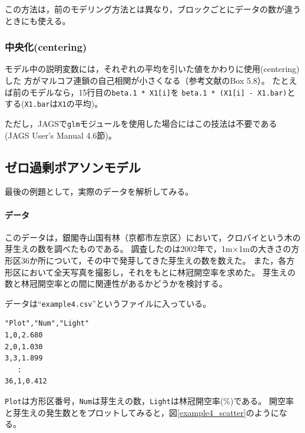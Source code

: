 \documentclass[11pt,uplatex]{jsarticle}
\begin{document}
この方法は，前のモデリング方法とは異なり，ブロックごとにデータの数が違うときにも使える。

\subsubsection*{中央化(centering)}

モデル中の説明変数には，それぞれの平均を引いた値をかわりに使用(centering)した
方がマルコフ連鎖の自己相関が小さくなる（参考文献\cite{McCarthy}のBox 5.8）。
たとえば前のモデルなら，15行目の\texttt{beta.1 * X1[i]}を
\texttt{beta.1 * (X1[i] - X1.bar)}とする(\texttt{X1.bar}は\texttt{X1}の平均)。

ただし，\textsf{JAGS}で\texttt{glm}モジュールを使用した場合にはこの技法は不要である
(JAGS User's Manual\cite{JAGS} 4.6節)。


\subsection{ゼロ過剰ポアソンモデル}
\label{path}

最後の例題として，実際のデータを解析してみる。

\paragraph{データ}
このデータは，銀閣寺山国有林（京都市左京区）において，クロバイという木の芽生えの数を調べたものである。
調査したのは2002年で，1m×1mの大きさの方形区36か所について，その中で発芽してきた芽生えの数を数えた。
また，各方形区において全天写真を撮影し，それをもとに林冠開空率を求めた。
芽生えの数と林冠開空率との間に関連性があるかどうかを検討する。

データは``\texttt{example4.csv}''というファイルに入っている。
\vspace{1zw}
\begin{lstlisting}
"Plot","Num","Light"
1,0,2.680
2,0,1.030
3,3,1.899
   :
36,1,0.412
\end{lstlisting}
\noindent
\texttt{Plot}は方形区番号，\texttt{Num}は芽生えの数，\texttt{Light}は林冠開空率(\%)である。
開空率と芽生えの発生数とをプロットしてみると，図\ref{example4_scatter}のようになる。
\end{document}
